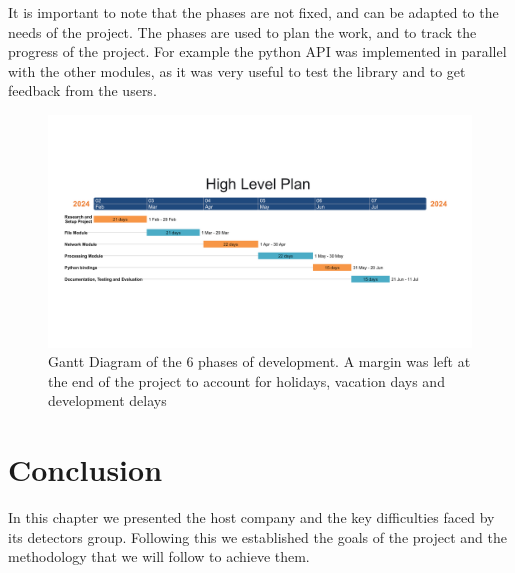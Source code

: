 \begin{spacing}{1.2}
    It is important to note that the phases are not fixed, and can be adapted to the needs of the project. The phases are used to plan the work, and to track the progress of the project.
    For example the python API was implemented in parallel with the other modules, as it was very useful to test the library and to get feedback from the users.

    \begin{figure}[h]\centering
        \includegraphics[width=\textwidth]{Chapitre1/figures/gantt.png}
        \caption{Gantt Diagram of the 6 phases of development. A margin was left at the end of the project to account for
            holidays, vacation days and development delays}
        \label{fig:gantt}
    \end{figure}

    \section*{Conclusion}
    In this chapter we presented the host company and the key difficulties faced
    by its detectors group. Following this we established the goals of the project
    and the methodology that we will follow to achieve them.


\end{spacing}
